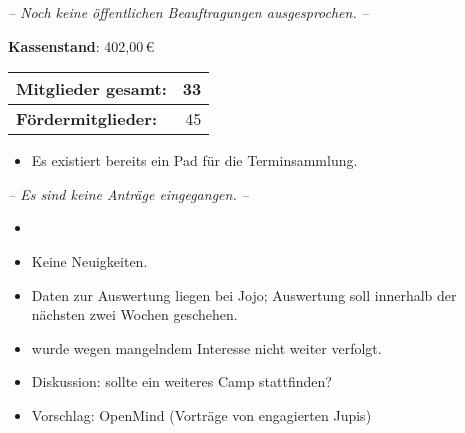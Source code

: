 \begin{Protokoll}
        \emph{-- Noch keine öffentlichen Beauftragungen ausgesprochen. --}
    
    
    \textbf{Kassenstand}: 402,00\,\euro
    
    \begin{center}
        \begin{tabular}{|l||r|}
            \hline
            \textbf{Mitglieder gesamt:}             & 33  \\
            \hline
            \textbf{Fördermitglieder:}                & 45 \\                
            \hline
            \hline
        \end{tabular}
    \end{center}
     
    
    \begin{description}
        \item
    \end{description}
    
    \begin{itemize}
        \item  Es existiert bereits ein Pad für die Terminsammlung.
    \end{itemize}
    
    \emph{-- Es sind keine Anträge eingegangen. --}
    
    \begin{itemize}
        \item 
    \end{itemize}
        
    \begin{itemize}
        \item Keine Neuigkeiten.
        \item Daten zur Auswertung liegen bei Jojo; Auswertung soll innerhalb der nächsten zwei Wochen geschehen.
    \end{itemize}

    \begin{itemize}
        \item wurde wegen mangelndem Interesse nicht weiter verfolgt.
        \item Diskussion: sollte ein weiteres Camp stattfinden?
        \item Vorschlag: OpenMind (Vorträge von engagierten Jupis)
    \end{itemize}
    

\end{Protokoll}
